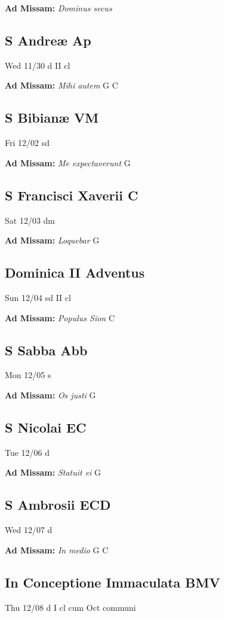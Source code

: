 \documentclass[letterpaper, 10pt, twocolumn]{article}
\begin{document}
\textbf{Ad Missam:} \textit{Dominus secus} 

\subsection*{S Andreæ Ap}Wed 11/30 d II cl

\textbf{Ad Missam:} \textit{Mihi autem} G C 

\subsection*{S Bibianæ VM}Fri 12/02 sd

\textbf{Ad Missam:} \textit{Me expectaverunt} G 

\subsection*{S Francisci Xaverii C}Sat 12/03 dm

\textbf{Ad Missam:} \textit{Loquebar} G 

\subsection*{Dominica II Adventus}Sun 12/04 sd II cl

\textbf{Ad Missam:} \textit{Populus Sion} C 

\subsection*{S Sabba Abb}Mon 12/05 s

\textbf{Ad Missam:} \textit{Os justi} G 

\subsection*{S Nicolai EC}Tue 12/06 d

\textbf{Ad Missam:} \textit{Statuit ei} G 

\subsection*{S Ambrosii ECD}Wed 12/07 d

\textbf{Ad Missam:} \textit{In medio} G C 

\subsection*{In Conceptione Immaculata BMV}Thu 12/08 d I cl cum Oct communi
\end{document}

